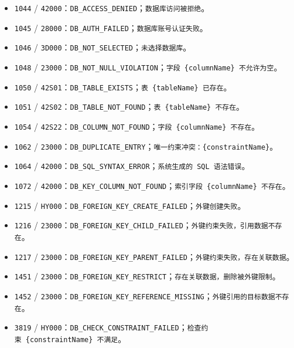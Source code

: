 \documentclass[
  a4paper,
  UTF8]{ctexart}
\providecommand{\tightlist}{%
  \setlength{\itemsep}{0pt}\setlength{\parskip}{0pt}}
\begin{document}
\begin{itemize}
\tightlist
\item
  \texttt{1044} /
  \texttt{42000}：\texttt{DB\_ACCESS\_DENIED}；\texttt{数据库访问被拒绝}。
\item
  \texttt{1045} /
  \texttt{28000}：\texttt{DB\_AUTH\_FAILED}；\texttt{数据库账号认证失败}。
\item
  \texttt{1046} /
  \texttt{3D000}：\texttt{DB\_NOT\_SELECTED}；\texttt{未选择数据库}。
\item
  \texttt{1048} /
  \texttt{23000}：\texttt{DB\_NOT\_NULL\_VIOLATION}；\texttt{字段\ \{columnName\}\ 不允许为空}。
\item
  \texttt{1050} /
  \texttt{42S01}：\texttt{DB\_TABLE\_EXISTS}；\texttt{表\ \{tableName\}\ 已存在}。
\item
  \texttt{1051} /
  \texttt{42S02}：\texttt{DB\_TABLE\_NOT\_FOUND}；\texttt{表\ \{tableName\}\ 不存在}。
\item
  \texttt{1054} /
  \texttt{42S22}：\texttt{DB\_COLUMN\_NOT\_FOUND}；\texttt{字段\ \{columnName\}\ 不存在}。
\item
  \texttt{1062} /
  \texttt{23000}：\texttt{DB\_DUPLICATE\_ENTRY}；\texttt{唯一约束冲突：\{constraintName\}}。
\item
  \texttt{1064} /
  \texttt{42000}：\texttt{DB\_SQL\_SYNTAX\_ERROR}；\texttt{系统生成的\ SQL\ 语法错误}。
\item
  \texttt{1072} /
  \texttt{42000}：\texttt{DB\_KEY\_COLUMN\_NOT\_FOUND}；\texttt{索引字段\ \{columnName\}\ 不存在}。
\item
  \texttt{1215} /
  \texttt{HY000}：\texttt{DB\_FOREIGN\_KEY\_CREATE\_FAILED}；\texttt{外键创建失败}。
\item
  \texttt{1216} /
  \texttt{23000}：\texttt{DB\_FOREIGN\_KEY\_CHILD\_FAILED}；\texttt{外键约束失败，引用数据不存在}。
\item
  \texttt{1217} /
  \texttt{23000}：\texttt{DB\_FOREIGN\_KEY\_PARENT\_FAILED}；\texttt{外键约束失败，存在关联数据}。
\item
  \texttt{1451} /
  \texttt{23000}：\texttt{DB\_FOREIGN\_KEY\_RESTRICT}；\texttt{存在关联数据，删除被外键限制}。
\item
  \texttt{1452} /
  \texttt{23000}：\texttt{DB\_FOREIGN\_KEY\_REFERENCE\_MISSING}；\texttt{外键引用的目标数据不存在}。
\item
  \texttt{3819} /
  \texttt{HY000}：\texttt{DB\_CHECK\_CONSTRAINT\_FAILED}；\texttt{检查约束\ \{constraintName\}\ 不满足}。
\end{itemize}
\end{document}
